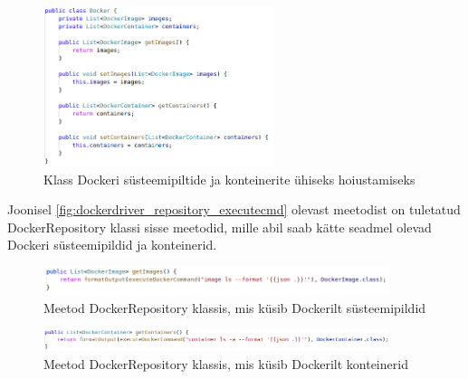 \documentclass[12pt]{article}
\begin{document}
 \begin{figure} [ht] %
 \begin{center}
 \includegraphics[width=0.6\textwidth]{dockerdriver_docker}
 \caption{Klass Dockeri süsteemipiltide ja konteinerite ühiseks hoiustamiseks}
 \label{fig:dockerdriver_docker}
 \end{center}
 \end{figure}

 
 \FloatBarrier

 Joonisel \ref{fig:dockerdriver_repository_executecmd} olevast meetodist on tuletatud
 DockerRepository klassi sisse meetodid, mille abil saab kätte
 seadmel olevad Dockeri süsteemipildid ja konteinerid. 

 \begin{figure} [ht] %
 \begin{center}
 \includegraphics[width=0.9\textwidth]{dockerdriver_repository_getimages}
 \caption{Meetod DockerRepository klassis, mis küsib Dockerilt süsteemipildid}
 \label{fig:dockerdriver_repository_getimages}
 \end{center}
 \end{figure}

 \begin{figure} [ht] %
 \begin{center}
 \includegraphics[width=0.9\textwidth]{dockerdriver_repository_getcontainers}
 \caption{Meetod DockerRepository klassis, mis küsib Dockerilt konteinerid}
 \label{fig:dockerdriver_repository_getcontainers}
 \end{center}
 \end{figure}
\end{document}
